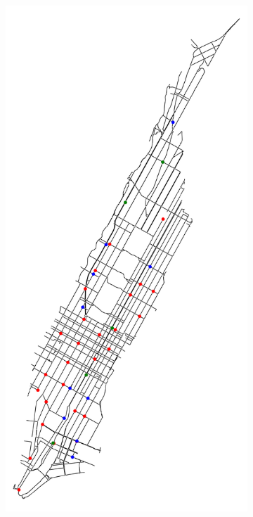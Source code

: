\begin{figure}[tbh]
\begin{subfigure}[b]{0.32\textwidth}
		\caption{}
		\label{fig:nyc_rn_info}
	\end{subfigure}
	\begin{subfigure}[b]{0.32\textwidth}
		\centering
		\includegraphics[width=\textwidth]{assets/img/new_york_simplified_info.png}

\end{subfigure}
\end{figure}
